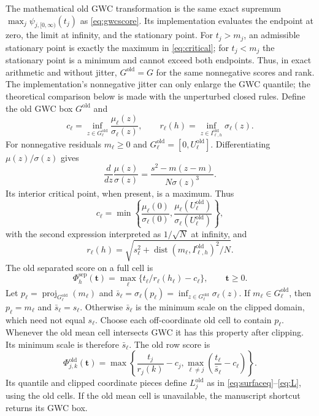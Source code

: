 \documentclass[11pt]{article}
\newcommand{\tvec}{\mathbf t}\newcommand{\zvec}{\mathbf z}\newcommand{\evec}{\mathbf e}
\begin{document}
The mathematical old GWC transformation is the same exact supremum
$\max_j\psi_{j,[0,\infty)}(t_j)$ as \eqref{eq:gwcscore}. Its implementation
evaluates the endpoint at zero, the limit at infinity, and the stationary
point. For $t_j>m_j$, an admissible stationary point is exactly the maximum
in \eqref{eq:critical}; for $t_j<m_j$ the stationary point is a minimum and
cannot exceed both endpoints. Thus, in exact arithmetic and without jitter,
$G^{\mathrm{old}}=G$ for the same nonnegative scores and rank.
The implementation's nonnegative jitter can only enlarge the GWC quantile;
the theoretical comparison below is made with the unperturbed closed rules.
 Define the old GWC box $G^{\mathrm{old}}$ and
\begin{equation}\label{eq:oldconst}
 c_\ell=\inf_{z\in G^{\mathrm{old}}_\ell}\frac{\mu_\ell(z)}{\sigma_\ell(z)},
 \qquad r_\ell(h)=\inf_{z\in I^{\mathrm{old}}_{\ell,h}}\sigma_\ell(z).
\end{equation}
For nonnegative residuals $m_\ell\ge0$ and
$G^{\mathrm{old}}_\ell=[0,U^{\mathrm{old}}_\ell]$. Differentiating
$\mu(z)/\sigma(z)$ gives
\[
 \frac{d}{dz}\frac{\mu(z)}{\sigma(z)}
 =\frac{s^2-m(z-m)}{N\sigma(z)^3}.
\]
Its interior critical point, when present, is a maximum. Thus
\[
 c_\ell=\min\left\{\frac{\mu_\ell(0)}{\sigma_\ell(0)},
                      \frac{\mu_\ell(U^{\mathrm{old}}_\ell)}
                           {\sigma_\ell(U^{\mathrm{old}}_\ell)}\right\},
\]
with the second expression interpreted as $1/\sqrt N$ at infinity, and
\[
 r_\ell(h)=\sqrt{s_\ell^2+
   \operatorname{dist}(m_\ell,I^{\mathrm{old}}_{\ell,h})^2/N}.
\]
The old separated score on a full cell is
\[
 \Phi_h^{\mathrm{sep}}(\tvec)
 =\max_\ell\{t_\ell/r_\ell(h_\ell)-c_\ell\},\qquad \tvec\ge0.
\]
Let $p_\ell=\operatorname{proj}_{G^{\mathrm{old}}_\ell}(m_\ell)$ and
$\bar s_\ell=\sigma_\ell(p_\ell)=\inf_{z\in G^{\mathrm{old}}_\ell}\sigma_\ell(z)$.
If $m_\ell\in G^{\mathrm{old}}_\ell$, then $p_\ell=m_\ell$ and
$\bar s_\ell=s_\ell$. Otherwise $\bar s_\ell$ is the minimum scale on the
clipped domain, which need not equal $s_\ell$.
Choose each off-coordinate old cell to contain $p_\ell$. Whenever the old
mean cell intersects GWC it has this property after clipping. Its minimum
scale is therefore $\bar s_\ell$. The old row score is
\begin{equation}\label{eq:oldrow}
 \Phi^{\mathrm{old}}_{j,k}(\tvec)=
 \max\left\{\frac{t_j}{r_j(k)}-c_j,
             \max_{\ell\ne j}\left(\frac{t_\ell}{\bar s_\ell}-c_\ell\right)\right\}.
\end{equation}
Its quantile and clipped coordinate pieces define $L_j^{\mathrm{old}}$ as
in \eqref{eq:surfaceq}--\eqref{eq:L}, using the old cells. If the old mean
cell is unavailable, the manuscript shortcut returns its GWC box.
\end{document}
